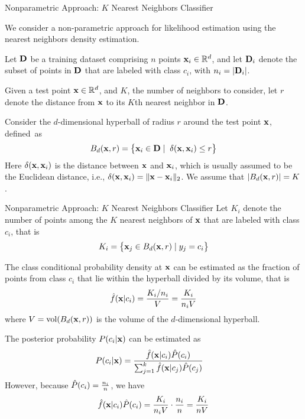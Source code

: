 \begin{frame}{Nonparametric Approach: $K$ Nearest Neighbors Classif\/{i}er}

We consider a
non-parametric approach for likelihood estimation 
using the nearest neighbors density estimation.

\medskip
Let $\mathbf{D}$ be a training dataset comprising $n$ points $\mathbf{x}_i \in
{\mathord{\mathbb R}}^d$, and let $\mathbf{D}_i$ denote the subset of points in $\mathbf{D}$ that are
labeled with class $c_i$, with $n_i = |\mathbf{D}_i|$.  

\medskip
Given a test point $\mathbf{x}
\in {\mathord{\mathbb R}}^d$, and $K$, the number of neighbors to consider, let $r$
denote the distance from $\mathbf{x}$ to its $K$th nearest neighbor in $\mathbf{D}$.

\medskip
Consider the $d$-dimensional hyperball of radius $r$ around the test
point $\mathbf{x}$, def\/{i}ned~as
\begin{align*}
  B_d(\mathbf{x},r) = \bigl\{\mathbf{x}_i \in \mathbf{D} \mid
  \;\delta(\mathbf{x},\mathbf{x}_i) \leq r\bigr\}
\end{align*}
Here $\delta(\mathbf{x}, \mathbf{x}_i)$ is the distance between $\mathbf{x}$ and $\mathbf{x}_i$,
which is usually assumed to be the Euclidean distance, i.e., $\delta(\mathbf{x},
\mathbf{x}_i) = \|\mathbf{x} - \mathbf{x}_i \|_2$.  We assume that $|B_d(\mathbf{x},r)| = K$.
\end{frame}


\begin{frame}{Nonparametric Approach: $K$ Nearest Neighbors Classif\/{i}er}
Let $K_i$ denote the number of points among the $K$ nearest neighbors of
$\mathbf{x}$ that are labeled with class $c_i$, that is
\begin{align*}
  K_i = \bigl\{\mathbf{x}_{j} \in B_d(\mathbf{x},r) \mid y_{j} = c_i\bigr\}
\end{align*}

The class conditional probability density at $\mathbf{x}$ can be estimated as
the fraction of points from class $c_i$ that lie within the hyperball
divided by its volume, that is
\begin{align*}
  \kern3pt\hat{\kern-3pt f}(\mathbf{x}|c_i) = \frac{K_i\text{/}n_i}{V}  = \frac{K_i}{n_i V}
\end{align*}
where $V = \vol(B_d(\bx,r))$ is the volume of the $d$-dimensional
hyperball.

The posterior probability $P(c_i|\mathbf{x})$
can be estimated as
\begin{align*}
    P(c_i|\mathbf{x}) &
    = \frac{\kern3pt\hat{\kern-3pt f}(\mathbf{x}|c_i) \hat{P}(c_i)}{\sum_{j=1}^k \kern3pt\hat{\kern-3pt f}(\mathbf{x}|c_{j}) \hat{P}(c_{j})}
\end{align*}
However, because $\hat{P}(c_i) = \tfrac{n_i}{n}$, we have
\begin{align*}
  \kern3pt\hat{\kern-3pt f}(\mathbf{x}|c_i) \hat{P}(c_i) = \frac{K_i}{n_i V} \cdot \frac{n_i}{n} =
  \frac{K_i}{nV}
\end{align*}
\end{frame}


